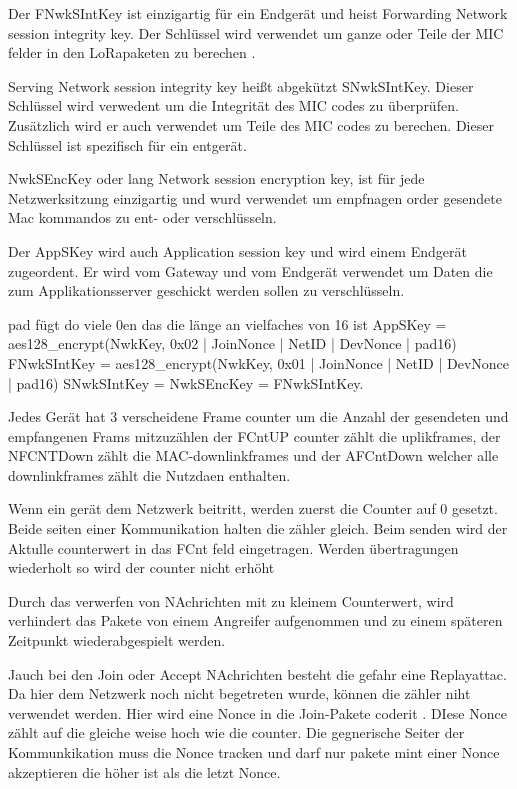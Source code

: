 \documentclass[a4paper,12pt]{article}
\begin{document}
        Der FNwkSIntKey ist einzigartig für ein Endgerät und heist Forwarding Network session integrity key. Der Schlüssel wird verwendet um ganze oder Teile der MIC felder in den LoRapaketen zu berechen . 
        
        Serving Network session integrity key heißt abgekützt SNwkSIntKey. Dieser Schlüssel wird
        verwedent um die Integrität des MIC codes zu überprüfen. Zusätzlich wird er auch verwendet um Teile des MIC codes zu berechen. Dieser Schlüssel ist spezifisch für ein entgerät.
        
        NwkSEncKey oder lang Network session encryption key, ist für jede Netzwerksitzung einzigartig und wurd verwendet um empfnagen order gesendete
        Mac kommandos zu ent- oder verschlüsseln.
        
        Der AppSKey wird auch Application session key und wird einem Endgerät zugeordent. Er wird vom Gateway und vom Endgerät verwendet um  Daten die zum Applikationsserver geschickt werden sollen zu verschlüsseln.
       
        pad fügt do viele 0en das die länge an vielfaches von 16 ist
        AppSKey = aes128\_encrypt(NwkKey, 0x02 | JoinNonce | NetID | DevNonce | pad16) 
        FNwkSIntKey = aes128\_encrypt(NwkKey, 0x01 | JoinNonce | NetID | DevNonce | pad16)
        SNwkSIntKey = NwkSEncKey = FNwkSIntKey.

        \bigbreak

        Jedes Gerät hat 3 verscheidene Frame counter um die Anzahl der gesendeten und empfangenen Frams mitzuzählen der FCntUP counter zählt die
        uplikframes, der NFCNTDown zählt die MAC-downlinkframes und der AFCntDown welcher alle downlinkframes zählt die Nutzdaen enthalten.

        Wenn ein gerät dem Netzwerk beitritt, werden zuerst die Counter auf 0 gesetzt. Beide seiten einer Kommunikation halten die zähler gleich. 
        Beim senden wird der Aktulle counterwert in das FCnt feld eingetragen. Werden übertragungen wiederholt so wird der counter nicht erhöht 

        Durch das verwerfen von NAchrichten mit zu kleinem Counterwert, wird verhindert das Pakete von einem Angreifer aufgenommen und zu einem späteren Zeitpunkt wiederabgespielt werden.
        
        Jauch bei den Join oder Accept NAchrichten besteht die gefahr eine Replayattac. Da hier dem Netzwerk noch nicht begetreten wurde, können die zähler niht verwendet werden. Hier wird eine Nonce in die 
        Join-Pakete coderit . DIese Nonce zählt auf die gleiche weise hoch wie die counter. Die gegnerische Seiter der Kommunkikation muss die Nonce tracken und darf nur pakete mint einer Nonce akzeptieren die höher ist als die letzt Nonce.
       
\end{document}
